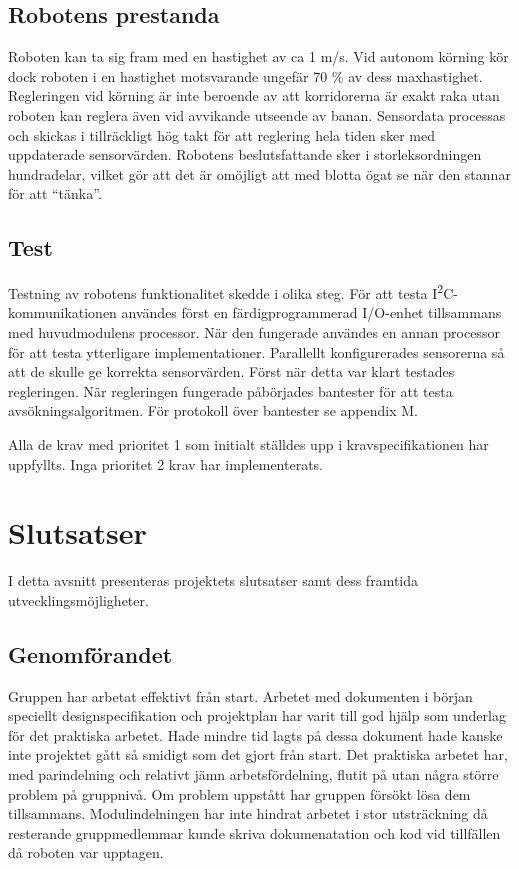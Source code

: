 \documentclass[11pt]{article}
\begin{document}
\begin{flushleft}
\subsection{Robotens prestanda}
Roboten kan ta sig fram med en hastighet av ca 1 m/s. Vid autonom körning kör dock roboten i en hastighet motsvarande ungefär 70 \% av dess maxhastighet. Regleringen vid körning är inte beroende av att korridorerna är exakt raka utan roboten kan reglera även vid avvikande utseende av banan. Sensordata processas och skickas i tillräckligt hög takt för att reglering hela tiden sker med uppdaterade sensorvärden. Robotens beslutsfattande sker i storleksordningen hundradelar, vilket gör att det är omöjligt att med blotta ögat se när den stannar för att ``tänka''. %

\subsection{Test}
Testning av robotens funktionalitet skedde i olika steg. För att testa I\textsuperscript{2}C-kommunikationen användes först en färdigprogrammerad I/O-enhet tillsammans med huvudmodulens processor. När den fungerade användes en annan processor för att testa ytterligare implementationer. Parallellt konfigurerades sensorerna så att de skulle ge korrekta sensorvärden. Först när detta var klart testades regleringen. När regleringen fungerade påbörjades bantester för att testa avsökningsalgoritmen. För protokoll över bantester se appendix M. 

Alla de krav med prioritet 1 som initialt ställdes upp i kravspecifikationen har uppfyllts. Inga prioritet 2 krav har implementerats.

\pagebreak

\section{Slutsatser}
I detta avsnitt presenteras projektets slutsatser samt dess framtida utvecklingsmöjligheter.

\subsection{Genomförandet}
Gruppen har arbetat effektivt från start. Arbetet med dokumenten i början speciellt designspecifikation och projektplan har varit till god hjälp som underlag för det praktiska arbetet. Hade mindre tid lagts på dessa dokument hade kanske inte projektet gått så smidigt som det gjort från start. Det praktiska arbetet har, med parindelning och relativt jämn arbetsfördelning, flutit på utan några större problem på gruppnivå. Om problem uppstått har gruppen försökt lösa dem tillsammans. Modulindelningen har inte hindrat arbetet i stor utsträckning då resterande gruppmedlemmar kunde skriva dokumenatation och kod vid tillfällen då roboten var upptagen. 


\end{flushleft}
\end{document}
